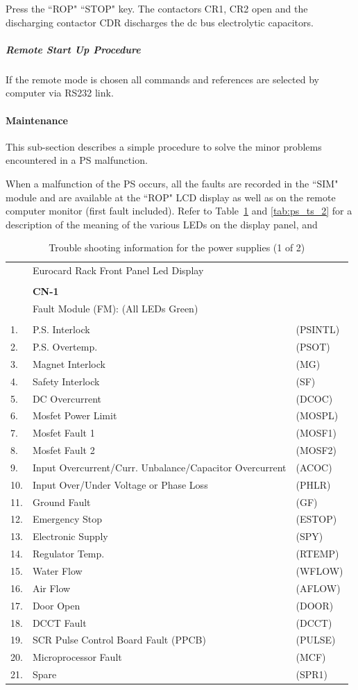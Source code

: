Press the ``ROP" ``STOP" key.  The contactors CR1, CR2 open and
the discharging contactor CDR discharges the dc bus electrolytic
capacitors.

\subparagraph{Remote Start Up Procedure}

If the remote mode is chosen all commands and references are
selected by computer via RS232 link.

\paragraph{Maintenance}

This sub-section describes a simple procedure to solve the minor
problems encountered in a PS malfunction.

When a malfunction of the PS occurs, all the faults are recorded
in the ``SIM" module and are available at the ``ROP" LCD display as well
as on the remote computer monitor (first fault included).  Refer to
 Table~\ref{tab:ps_ts_1} and \ref{tab:ps_ts_2} for a description of
the meaning of the various LEDs on the display panel, and
\begin{table}
\caption{Trouble shooting information for the power supplies (1 of 2) 
\label{tab:ps_ts_1}}
\begin{tabular}{lll}
& Eurocard Rack Front Panel Led Display &	\\
&	&	\\
& {\bf CN-1} &	\\
& Fault Module (FM):  (All LEDs Green) &	\\
&	&	\\
1.& P.S. Interlock	& (PSINTL)	\\
2.& P.S. Overtemp.	& (PSOT)	\\
3.& Magnet Interlock	& (MG)	\\
4.& Safety Interlock	& (SF) \\
5.& DC Overcurrent	& (DCOC) \\
6.& Mosfet Power Limit	& (MOSPL) \\
7.& Mosfet Fault 1	& (MOSF1) \\
8.& Mosfet Fault 2	& (MOSF2) \\
9.& Input Overcurrent/Curr. Unbalance/Capacitor Overcurrent
& (ACOC) \\
10.& Input Over/Under Voltage or Phase Loss & (PHLR) \\
11.& Ground Fault & (GF) \\
12.& Emergency Stop & (ESTOP) \\
13.& Electronic Supply & (SPY) \\
14.& Regulator Temp. & (RTEMP) \\
15.& Water Flow & (WFLOW) \\
16.& Air Flow & (AFLOW) \\
17.& Door Open & (DOOR) \\
18.& DCCT Fault & (DCCT) \\
19.& SCR Pulse Control Board Fault (PPCB) & (PULSE) \\
20.& Microprocessor Fault & (MCF) \\
21.& Spare & (SPR1) \\
\end{tabular}
\end{table}

